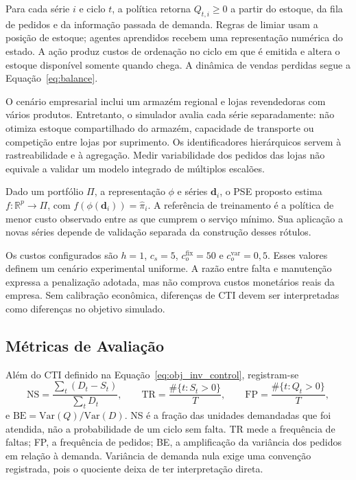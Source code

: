 Para cada série $i$ e ciclo $t$, a política retorna $Q_{t,i}\geq0$ a partir do estoque, da fila de pedidos e da informação passada de demanda. Regras de limiar usam a posição de estoque; agentes aprendidos recebem uma representação numérica do estado. A ação produz custos de ordenação no ciclo em que é emitida e altera o estoque disponível somente quando chega. A dinâmica de vendas perdidas segue a Equação~\ref{eq:balance}.

O cenário empresarial inclui um armazém regional e lojas revendedoras com vários produtos. Entretanto, o simulador avalia cada série separadamente: não otimiza estoque compartilhado do armazém, capacidade de transporte ou competição entre lojas por suprimento. Os identificadores hierárquicos servem à rastreabilidade e à agregação. Medir variabilidade dos pedidos das lojas não equivale a validar um modelo integrado de múltiplos escalões.

\begin{defi}
Dado um portfólio $\Pi$, a representação $\phi$ e séries $\mathbf d_i$, o PSE proposto estima $f:\mathbb R^p\rightarrow\Pi$, com $f(\phi(\mathbf d_i))=\hat\pi_i$. A referência de treinamento é a política de menor custo observado entre as que cumprem o serviço mínimo. Sua aplicação a novas séries depende de validação separada da construção desses rótulos.
\end{defi}

Os custos configurados são $h=1$, $c_s=5$, $c_o^{\mathrm{fix}}=50$ e $c_o^{\mathrm{var}}=0{,}5$. Esses valores definem um cenário experimental uniforme. A razão entre falta e manutenção expressa a penalização adotada, mas não comprova custos monetários reais da empresa. Sem calibração econômica, diferenças de CTI devem ser interpretadas como diferenças no objetivo simulado.

\subsection{Métricas de Avaliação}
\label{sec:metricas_avaliacao}

Além do CTI definido na Equação~\ref{eq:obj_inv_control}, registram-se
\[
\mathrm{NS}=\frac{\sum_t(D_t-S_t)}{\sum_tD_t},\qquad
\mathrm{TR}=\frac{\#\{t:S_t>0\}}T,\qquad
\mathrm{FP}=\frac{\#\{t:Q_t>0\}}T,
\]
e $\mathrm{BE}=\mathrm{Var}(Q)/\mathrm{Var}(D)$. NS é a fração das unidades demandadas que foi atendida, não a probabilidade de um ciclo sem falta. TR mede a frequência de faltas; FP, a frequência de pedidos; BE, a amplificação da variância dos pedidos em relação à demanda. Variância de demanda nula exige uma convenção registrada, pois o quociente deixa de ter interpretação direta.

